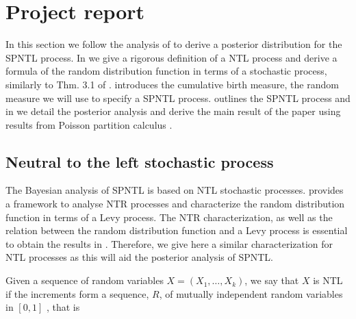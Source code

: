 

\section{Project report}\label{project_report}

In this section we follow the analysis of \cite{james2006poisson} to derive a posterior distribution for the SPNTL process. In  we give a rigorous definition of a NTL process and derive a formula of the random distribution function in terms of a stochastic process, similarly to Thm. 3.1 of \cite{doksum1974tailfree}.  introduces the cumulative birth measure, the random measure we will use to specify a SPNTL process.  outlines the SPNTL process and in  we detail the posterior analysis and derive the main result of the paper using results from Poisson partition calculus \cite{james2005poisson,james2006poisson}.

\subsection{Neutral to the left stochastic process}\label{NTL_definition}
The Bayesian analysis of SPNTL is based on NTL stochastic processes. \cite{doksum1974tailfree} provides a framework to analyse NTR processes and characterize the random distribution function in terms of a Levy process. The NTR characterization, as well as the relation between the random distribution function and a Levy process is essential to obtain the results in \cite{james2006poisson}. Therefore, we give here a similar characterization for NTL processes as this will aid the posterior analysis of SPNTL.

Given a sequence of random variables $X = (X_1, \ldots, X_k)$, we say that $X$ is NTL if the increments form a sequence, $R$, of mutually independent random variables in $[0, 1]$ \cite{bloem2018sampling}, that is

